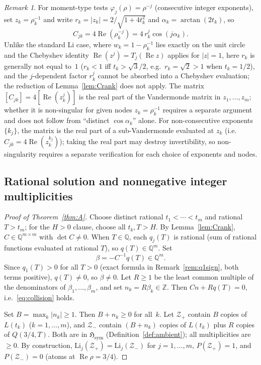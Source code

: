 \documentclass[12pt]{amsart}
\theoremstyle{definition}
\theoremstyle{remark}
\newtheorem{remark}[definition]{Remark}
\theoremstyle{plain}
\newcommand{\Hsym}{\mathfrak{H}_{\mathrm{sym}}}
\newcommand{\Li}{\mathrm{Li}}
\newcommand{\re}{\operatorname{Re}}
\newcommand{\QQ}{\mathbb{Q}}
\newcommand{\ZZ}{\mathbb{Z}}
\begin{document}
\begin{remark}
\label{rem:momentVander}
For moment-type tests $\varphi_j(\rho) = \rho^{-j}$ (consecutive integer
exponents), set $z_k = \rho_k^{-1}$ and write
$r_k = |z_k| = 2/\sqrt{1+4t_k^2}$ and $\alpha_k = \arctan(2t_k)$, so
\[
  C_{jk} = 4\re(\rho_k^{-j}) = 4\,r_k^j\cos(j\alpha_k).
\]
Unlike the standard Li case, where $w_k = 1-\rho_k^{-1}$ lies exactly on the
unit circle and the Chebyshev identity $\re(z^j)=T_j(\re z)$ applies for
$|z|=1$, here $r_k$ is generally not equal to~$1$ ($r_k<1$ iff $t_k>\sqrt{3}/2$,
e.g.\ $r_k=\sqrt{2}>1$ when $t_k=1/2$), and the $j$-dependent factor $r_k^j$ cannot be
absorbed into a Chebyshev evaluation; the reduction of
Lemma~\ref{lem:Crank} does not apply.  The matrix $[C_{jk}] = 4[\re(z_k^j)]$
is the real part of the Vandermonde matrix in $z_1,\ldots,z_m$; whether
it is non-singular for given nodes $z_k = \rho_k^{-1}$ requires a separate
argument and does not follow from ``distinct $\cos\alpha_k$'' alone.
For non-consecutive exponents $\{k_j\}$, the matrix is the real part of a
sub-Vandermonde evaluated at $z_k$ (i.e.\ $C_{jk}=4\operatorname{Re}(z_k^{k_j})$);
taking the real part may destroy invertibility, so non-singularity requires a separate
verification for each choice of exponents and nodes.
\end{remark}

\subsection{Rational solution and nonnegative integer multiplicities}

\begin{proof}[Proof of Theorem~\ref{thm:A}]
Choose distinct rational $t_1 < \cdots < t_m$ and rational $T > t_m$;
for the $H>0$ clause, choose all $t_k, T > H$.
By Lemma~\ref{lem:Crank}, $C \in \QQ^{m\times m}$ with $\det C \neq 0$.
When $T \in \QQ$, each $q_j(T)$ is rational (sum of rational functions
evaluated at rational $T$), so $q(T) \in \QQ^m$.  Set
\[
  \beta = -C^{-1} q(T) \in \QQ^m.
\]
Since $q_1(T) > 0$ for all $T>0$ (exact formula in
Remark~\ref{rem:q1sign}, both terms positive), $q(T) \neq 0$,
so $\beta \neq 0$.
Let $R\ge 1$ be the least common multiple of the denominators of
$\beta_1,\ldots,\beta_m$, and set $n_k = R\beta_k \in \ZZ$.
Then $Cn + Rq(T) = 0$, i.e.\ \eqref{eq:collision} holds.

Set $B = \max_k |n_k| \geq 1$.  Then $B + n_k \geq 0$ for all~$k$.
Let $\mathcal{Z}_+$ contain $B$ copies of $L(t_k)$ ($k=1,\ldots,m$),
and $\mathcal{Z}_-$ contain $(B + n_k)$ copies of $L(t_k)$ plus $R$
copies of $Q(3/4, T)$.  Both are in $\Hsym$ (Definition~\ref{def:ambient}); all multiplicities are
$\geq 0$.  By construction, $\Li_j(\mathcal{Z}_+) = \Li_j(\mathcal{Z}_-)$
for $j=1,\ldots,m$, $P(\mathcal{Z}_+) = 1$, and $P(\mathcal{Z}_-) = 0$
(atoms at $\re\rho = 3/4$).
\end{proof}
\end{document}
